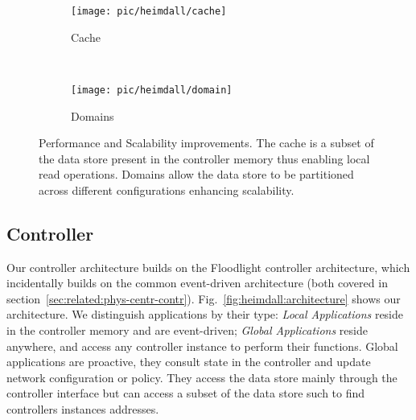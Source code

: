 \begin{figure}
  \centering
  \begin{subfigure}[b]{0.5\textwidth}
                \centering
                \texttt{[image: pic/heimdall/cache]}
                \caption{Cache}
                \label{fig:heimdall:cache}
        \end{subfigure}%
        ~
        \begin{subfigure}[b]{0.5\textwidth}
                \centering
                \texttt{[image: pic/heimdall/domain]}
                \caption{Domains}
                \label{fig:heimdall:domains}
        \end{subfigure}
        \caption[Performance and Scalability]{Performance and Scalability improvements. The cache is a subset of the data store present in the controller memory thus enabling local read operations. Domains allow the data store to be  partitioned across different configurations enhancing scalability.}
        \label{fig:heimdall:cache-domains} 
\end{figure}




\subsection{Controller}

Our controller architecture builds on the Floodlight controller architecture, which incidentally builds on the common event-driven architecture  (both covered in section~\ref{sec:related:phys-centr-contr}). 
Fig.~\ref{fig:heimdall:architecture} shows  our architecture. 
We distinguish applications by their type: \emph{Local Applications}  reside in the controller memory and are event-driven; \emph{Global Applications} reside anywhere, and access any controller instance to perform their functions. 
Global applications are proactive, they consult state in the controller and update network configuration or policy. They access the data store mainly through the controller interface but can access a subset of the data store such to find controllers instances addresses. 

